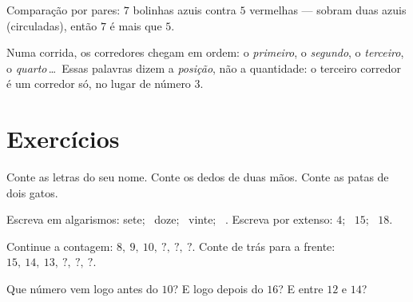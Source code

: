 \begin{omfigure}

{\small Comparação por pares: $7$ bolinhas azuis contra $5$
vermelhas --- sobram duas azuis (circuladas), então $7$ é mais que
$5$.}
\end{omfigure}

\begin{example}\label{ex:g1:counting:ordinal}
Numa corrida, os corredores chegam em ordem: o \emph{primeiro}, o
\emph{segundo}, o \emph{terceiro}, o \emph{quarto}\,\dots\ Essas
palavras dizem a \emph{posição}, não a quantidade: o terceiro
corredor é um corredor só, no lugar de número $3$.
\end{example}

\section{Exercícios}

\begin{exercise}[$\star$]\label{exo:g1:counting:1}
Conte as letras do seu nome. Conte os dedos de duas mãos. Conte as
patas de dois gatos.
\end{exercise}

\begin{exercise}[$\star$]\label{exo:g1:counting:2}
Escreva em algarismos: sete; \ doze; \ vinte; \ . Escreva por
extenso: $4$; \ $15$; \ $18$.
\end{exercise}

\begin{exercise}[$\star$]\label{exo:g1:counting:3}
Continue a contagem: $8,\ 9,\ 10,\ ?,\ ?,\ ?$. Conte de trás para a
frente: $15,\ 14,\ 13,\ ?,\ ?,\ ?$.
\end{exercise}

\begin{exercise}[$\star$]\label{exo:g1:counting:4}
Que número vem logo antes do $10$? E logo depois do $16$? E entre
$12$ e $14$?
\end{exercise}

